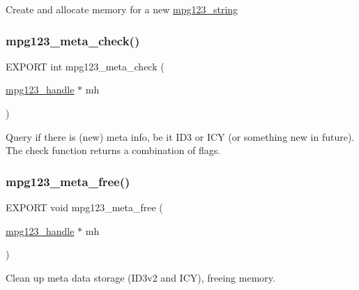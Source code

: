 Create and allocate memory for a new \hyperlink{structmpg123__string}{mpg123\+\_\+string} \mbox{\label{group__mpg123__metadata_gad1df8bdc0bf70197a668e11819f260d2}} 
\subsubsection{\texorpdfstring{mpg123\+\_\+meta\+\_\+check()}{mpg123\_meta\_check()}}
{\footnotesize\ttfamily E\+X\+P\+O\+RT int mpg123\+\_\+meta\+\_\+check (\begin{DoxyParamCaption}\item[{\hyperlink{group__mpg123__init_ga6728e2839a395f3a07d4514da659faca}{mpg123\+\_\+handle} $\ast$}]{mh }\end{DoxyParamCaption})}

Query if there is (new) meta info, be it I\+D3 or I\+CY (or something new in future). The check function returns a combination of flags. \mbox{\label{group__mpg123__metadata_ga4661443ff7cf899309bcf0b737873921}} 
\subsubsection{\texorpdfstring{mpg123\+\_\+meta\+\_\+free()}{mpg123\_meta\_free()}}
{\footnotesize\ttfamily E\+X\+P\+O\+RT void mpg123\+\_\+meta\+\_\+free (\begin{DoxyParamCaption}\item[{\hyperlink{group__mpg123__init_ga6728e2839a395f3a07d4514da659faca}{mpg123\+\_\+handle} $\ast$}]{mh }\end{DoxyParamCaption})}

Clean up meta data storage (I\+D3v2 and I\+CY), freeing memory. \mbox{\label{group__mpg123__metadata_gafa0fa74b81fa70e24a8fd89e88e4fe77}} 
